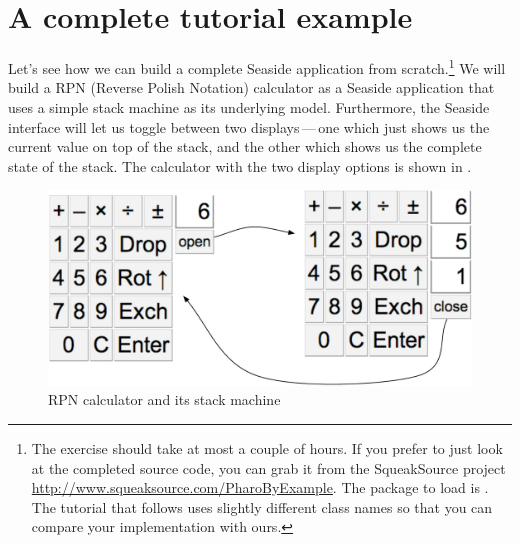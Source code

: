 \documentclass[a4paper,10pt,twoside]{book}
\begin{document}

\section{A complete tutorial example}


Let's see how we can build a complete Seaside application from scratch.\footnote{The exercise should take at most a couple of hours. If you prefer to just look at the completed source code, you can grab it from the SqueakSource project \url{http://www.squeaksource.com/PharoByExample}.
The package to load is . The tutorial that follows uses slightly different class names so that you can compare your implementation with ours.}
We will build a RPN (Reverse Polish Notation) calculator as a Seaside application that uses a simple stack machine as its underlying model.
Furthermore, the Seaside interface will let us toggle between two displays\,---\,one which just shows us the current value on top of the stack, and the other which shows us the complete state of the stack.
The calculator with the two display options is shown in .

\begin{figure}[ht]
\begin{center}
\includegraphics[width=\textwidth]{stackMachine}
\caption{RPN calculator and its stack machine}
\end{center}
\end{figure}
\end{document}

